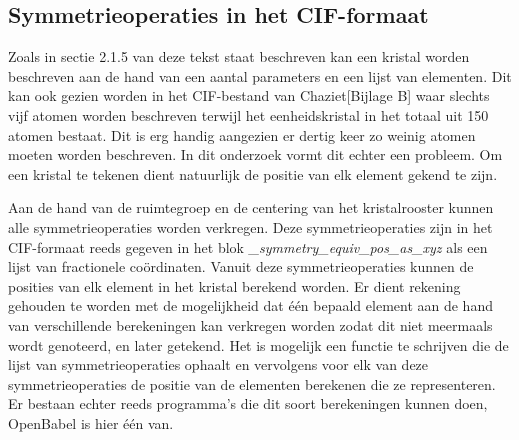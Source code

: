 \subsection{Symmetrieoperaties in het CIF-formaat}
Zoals in sectie 2.1.5 van deze tekst staat beschreven kan een kristal worden beschreven aan de hand van een aantal parameters en een lijst van elementen. Dit kan ook gezien worden in het CIF-bestand van Chaziet[Bijlage B] waar slechts vijf atomen worden beschreven terwijl het eenheidskristal in het totaal uit 150 atomen bestaat. Dit is erg handig aangezien er dertig keer zo weinig atomen moeten worden beschreven. In dit onderzoek vormt dit echter een probleem. Om een kristal te tekenen dient natuurlijk de positie van elk element gekend te zijn.
\par
Aan de hand van de ruimtegroep en de centering van het kristalrooster kunnen alle symmetrieoperaties worden verkregen. Deze symmetrieoperaties zijn in het CIF-formaat reeds gegeven in het blok \textit{\_symmetry\_equiv\_pos\_as\_xyz} als een lijst van fractionele coördinaten. Vanuit deze symmetrieoperaties kunnen de posities van elk element in het kristal berekend worden. Er dient rekening gehouden te worden met de mogelijkheid dat één bepaald element aan de hand van verschillende berekeningen kan verkregen worden zodat dit niet meermaals wordt genoteerd, en later getekend. Het is mogelijk een functie te schrijven die de lijst van symmetrieoperaties ophaalt en vervolgens voor elk van deze symmetrieoperaties de positie van de elementen berekenen die ze representeren. Er bestaan echter reeds programma's die dit soort berekeningen kunnen doen, OpenBabel is hier één van.
\par
